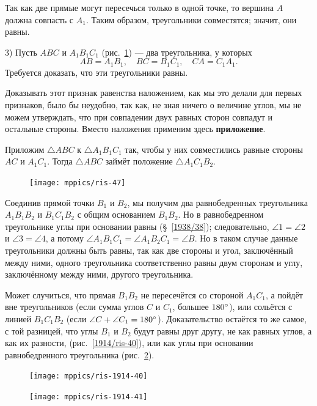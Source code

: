 \documentclass[oneside]{book}
\begin{document}
Так как две прямые могут пересечься только в одной точке, то вершина $A$ должна совпасть с $A_1$.
Таким образом, треугольники совместятся;
значит, они равны.

3) Пусть $ABC$ и $A_1B_1C_1$ (рис.~\ref{1938/ris-47}) — два треугольника, у которых
\[AB = A_1B_1,
\quad
BC = B_1C_1,\quad 
CA = C_1A_1.
\]
Требуется доказать, что эти треугольники равны.

Доказывать этот признак равенства наложением, как мы это делали для первых признаков, было бы неудобно, так как, не зная ничего о величине углов, мы не можем утверждать, что при совпадении двух равных сторон совпадут и остальные стороны.
Вместо наложения применим здесь \textbf{приложение}.

Приложим $\triangle ABC$ к $\triangle A_1B_1C_1$ так, чтобы у них совместились равные стороны $AC$ и $A_1C_1$.
Тогда $\triangle ABC$ займёт положение $\triangle A_1C_1B_2$.

\begin{figure}
\centering
\texttt{[image: mppics/ris-47]}
\caption{}\label{1938/ris-47}
\end{figure}

Соединив прямой точки $B_1$ и $B_2$, мы получим два равнобедренных треугольника $A_1B_1B_2$ и $B_1C_1B_2$ с общим основанием $B_1B_2$.
Но в равнобедренном треугольнике углы при основании равны (§~\ref{1938/38});
следовательно, $\angle 1 = \angle 2$ и $\angle 3 = \angle 4$, а потому $\angle A_1B_1C_1 = \angle A_1B_2C_1 = \angle B$.
Но в таком случае данные треугольники должны быть равны, так как две стороны и угол, заключённый между ними, одного треугольника соответственно равны двум сторонам и углу, заключённому между ними, другого треугольника.


Может случиться, что прямая $B_1B_2$ не пересечётся со стороной $A_1C_1$,
а пойдёт вне треугольников (если сумма углов $C$ и $C_1$, большее $180\degree$),
или сольётся с линией $B_1C_1B_2$ (если $\angle C +\angle  C_1 = 180\degree$). Доказательство остаётся то же самое, с той разницей, что углы $B_1$ и $B_2$
будут равны друг другу, не как  равных углов, а как их разности, (рис.~\ref{1914/ris-40}), или как углы при основании равнобедренного треугольника (рис.~\ref{1914/ris-41}).

\begin{figure}[h!]
\begin{minipage}{.48\textwidth}
\centering
\texttt{[image: mppics/ris-1914-40]}
\caption{}\label{1914/ris-40}
\end{minipage}\hfill
\begin{minipage}{.48\textwidth}
\centering
\texttt{[image: mppics/ris-1914-41]}
\caption{}\label{1914/ris-41}
\end{minipage}
\end{figure}
\end{document}
